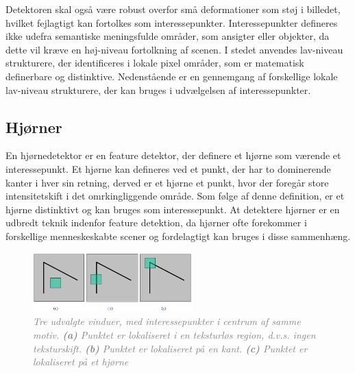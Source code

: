 Detektoren skal også være robust overfor små deformationer som støj i billedet, hvilket fejlagtigt kan fortolkes som interessepunkter. Interessepunkter defineres ikke udefra semantiske meningsfulde områder, som ansigter eller objekter, da dette vil kræve en høj-niveau fortolkning af scenen. I stedet anvendes lav-niveau strukturere, der identificeres i lokale pixel områder, som er matematisk definerbare og distinktive. Nedenstående er en gennemgang af forskellige lokale lav-niveau strukturere, der kan bruges i udvælgelsen af interessepunkter.
 \subsection{Hjørner}\label{subsec:corner}
En hjørnedetektor er en feature detektor, der definere et hjørne som værende et interessepunkt. Et hjørne kan defineres ved et punkt, der har to dominerende kanter i hver sin retning, derved er et hjørne et punkt, hvor der foregår store intensitetskift i det omrkingliggende område. Som følge af denne definition, er et hjørne distinktivt og kan bruges som interessepunkt. At detektere hjørner er en udbredt teknik indenfor feature detektion, da hjørner ofte forekommer i forskellige menneskeskabte scener og fordelagtigt kan bruges i disse sammenhæng.
\begin{figure}[H]
    \centering
    \includegraphics[width=0.55\textwidth]{fig/6.png}
    \vspace{-1em}   
    \begin{center}    
    \caption{\textcolor{gray}{\footnotesize \textit{
     Tre udvalgte vinduer, med interessepunkter i centrum af samme motiv. \textbf{(a)} Punktet er lokaliseret i en teksturløs region, d.v.s. ingen teksturskift. \textbf{(b)} Punktet er lokaliseret på en kant. \textbf{(c)} Punktet er lokaliseret på et hjørne }}}
    \label{fig:2}
     \end{center}
    \vspace{-2.7em}  
  \end{figure}  
\noindent
